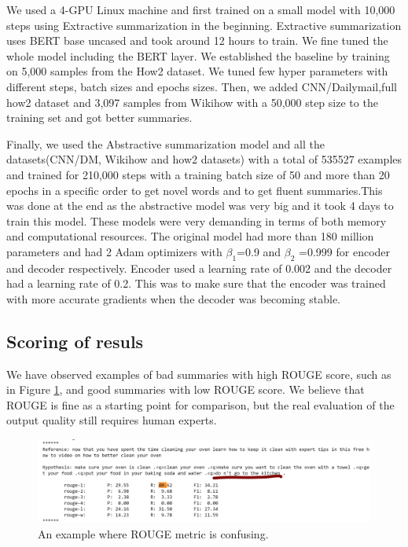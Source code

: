 \documentclass{article}
\begin{document}
We used a 4-GPU Linux machine and first trained on a small model with 10,000 steps using Extractive summarization in the beginning. Extractive summarization uses BERT base uncased and took around 12 hours to train. We fine tuned the whole model including the BERT layer. We established the baseline by training on 5,000 samples from the How2 dataset. We tuned few hyper parameters with different steps, batch sizes and epochs sizes. Then, we added CNN/Dailymail,full how2 dataset and 3,097 samples from Wikihow with a 50,000 step size to the training set and got better summaries. 

Finally, we used the Abstractive summarization model and all the datasets(CNN/DM, Wikihow and how2 datasets) with a total of 535527 examples and trained for 210,000 steps with a training batch size of 50 and more than 20 epochs in a specific order to get novel words and to get fluent summaries.This was done at the end as the abstractive model was very big and it took 4 days to train this model. These models were very demanding in terms of both memory and computational resources. The original model had more than 180 million parameters and had 2 Adam optimizers with $\beta_1$=0.9 and $\beta_2$ =0.999 for encoder and decoder respectively. Encoder used a learning rate of 0.002 and the decoder had a learning rate of 0.2. This was to make sure that the encoder was trained with more accurate gradients when the decoder was becoming stable.

\subsection{Scoring of resuls}
\label{Scoring}
We have observed examples of bad summaries with high ROUGE score, such as in Figure \ref{fig:funnysummary}, and good summaries with low ROUGE score. We believe that ROUGE is fine as a starting point for comparison, but the real evaluation of the output quality still requires human experts.

\begin{figure}[H]
  \includegraphics[width=\linewidth]{pic1.png}
  \caption{An example where ROUGE metric is confusing.}
  \label{fig:funnysummary}
\end{figure}
\end{document}
